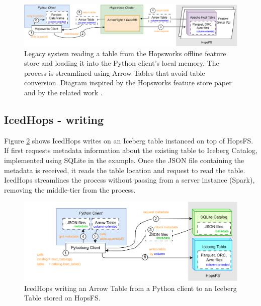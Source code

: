 \begin{figure}
    \begin{center}
      \includegraphics[width=\textwidth]{figures/2-background_and_related_work/hudi_read.png}
    \end{center}
    \caption[Legacy system - Hudi - read process]{Legacy system reading a table from the Hopsworks offline feature store and loading it into the Python client's local memory. The process is streamlined using Arrow Tables that avoid table conversion. Diagram inspired by the Hopsworks feature store paper \cite{10.1145/3626246.3653389} and by the related work \cite{manfrediReducingReadWrite2024}.}
    \label{fig:hudi_read}
\end{figure}



\subsection{IcedHops - writing}
\label{subsec:back_sys_iceberg_write}

Figure \ref{fig:iceberg_write} shows IcedHops writes on an Iceberg table instanced on top of \gls{HopsFS}. If first requests metadata information about the existing table to Iceberg Catalog, implemented using SQLite in the example. Once the JSON file containing the metadata is received, it reads the table location and request to read the table. IcedHops streamlines the process without passing from a server instance (Spark), removing the middle-tier from the process.

\begin{figure}
    \begin{center}
      \includegraphics[width=\textwidth]{figures/2-background_and_related_work/iceberg_write.png}
    \end{center}
    \caption[IcedHops - write process]{IcedHops writing an Arrow Table from a Python client to an Iceberg Table stored on \gls{HopsFS}.}
    \label{fig:iceberg_write}
\end{figure}



